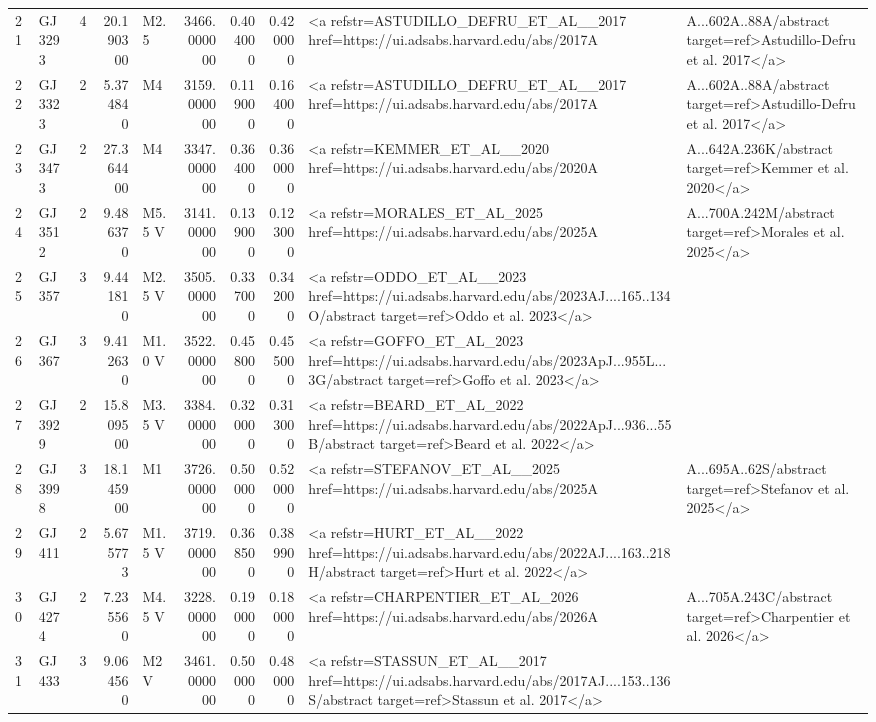 \begin{tabular}{llrrlrrrl}
21 & GJ 3293 & 4 & 20.190300 & M2.5 & 3466.000000 & 0.404000 & 0.420000 & <a refstr=ASTUDILLO_DEFRU_ET_AL__2017 href=https://ui.adsabs.harvard.edu/abs/2017A&A...602A..88A/abstract target=ref>Astudillo-Defru et al. 2017</a> \\
22 & GJ 3323 & 2 & 5.374840 & M4 & 3159.000000 & 0.119000 & 0.164000 & <a refstr=ASTUDILLO_DEFRU_ET_AL__2017 href=https://ui.adsabs.harvard.edu/abs/2017A&A...602A..88A/abstract target=ref>Astudillo-Defru et al. 2017</a> \\
23 & GJ 3473 & 2 & 27.364400 & M4 & 3347.000000 & 0.364000 & 0.360000 & <a refstr=KEMMER_ET_AL__2020 href=https://ui.adsabs.harvard.edu/abs/2020A&A...642A.236K/abstract target=ref>Kemmer et al. 2020</a> \\
24 & GJ 3512 & 2 & 9.486370 & M5.5 V & 3141.000000 & 0.139000 & 0.123000 & <a refstr=MORALES_ET_AL_2025 href=https://ui.adsabs.harvard.edu/abs/2025A&A...700A.242M/abstract target=ref>Morales et al. 2025</a> \\
25 & GJ 357 & 3 & 9.441810 & M2.5 V & 3505.000000 & 0.337000 & 0.342000 & <a refstr=ODDO_ET_AL__2023 href=https://ui.adsabs.harvard.edu/abs/2023AJ....165..134O/abstract target=ref>Oddo et al. 2023</a> \\
26 & GJ 367 & 3 & 9.412630 & M1.0 V & 3522.000000 & 0.458000 & 0.455000 & <a refstr=GOFFO_ET_AL_2023 href=https://ui.adsabs.harvard.edu/abs/2023ApJ...955L...3G/abstract target=ref>Goffo et al. 2023</a> \\
27 & GJ 3929 & 2 & 15.809500 & M3.5 V & 3384.000000 & 0.320000 & 0.313000 & <a refstr=BEARD_ET_AL_2022 href=https://ui.adsabs.harvard.edu/abs/2022ApJ...936...55B/abstract target=ref>Beard et al. 2022</a> \\
28 & GJ 3998 & 3 & 18.145900 & M1 & 3726.000000 & 0.500000 & 0.520000 & <a refstr=STEFANOV_ET_AL__2025 href=https://ui.adsabs.harvard.edu/abs/2025A&A...695A..62S/abstract target=ref>Stefanov et al. 2025</a> \\
29 & GJ 411 & 2 & 5.675773 & M1.5 V & 3719.000000 & 0.368500 & 0.389900 & <a refstr=HURT_ET_AL__2022 href=https://ui.adsabs.harvard.edu/abs/2022AJ....163..218H/abstract target=ref>Hurt et al. 2022</a> \\
30 & GJ 4274 & 2 & 7.235560 & M4.5 V & 3228.000000 & 0.190000 & 0.180000 & <a refstr=CHARPENTIER_ET_AL_2026 href=https://ui.adsabs.harvard.edu/abs/2026A&A...705A.243C/abstract target=ref>Charpentier et al. 2026</a> \\
31 & GJ 433 & 3 & 9.064560 & M2V & 3461.000000 & 0.500000 & 0.480000 & <a refstr=STASSUN_ET_AL__2017 href=https://ui.adsabs.harvard.edu/abs/2017AJ....153..136S/abstract target=ref>Stassun et al. 2017</a> \\

\end{tabular}
